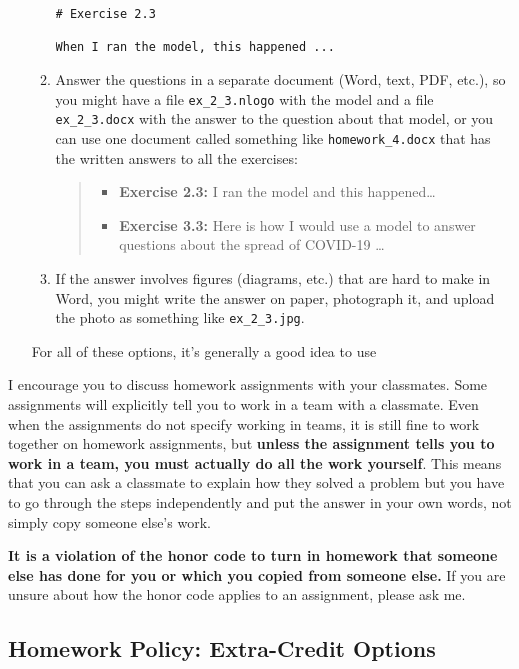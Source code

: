 \documentclass[
]{article}
\begin{document}
\begin{itemize}
\begin{enumerate}
\begin{verbatim}
# Exercise 2.3

When I ran the model, this happened ...
\end{verbatim}
  \item
    Answer the questions in a separate document (Word, text, PDF, etc.),
    so you might have a file \texttt{ex\_2\_3.nlogo} with the model and
    a file \texttt{ex\_2\_3.docx} with the answer to the question about
    that model, or you can use one document called something like
    \texttt{homework\_4.docx} that has the written answers to all the
    exercises:

    \begin{quote}
    \begin{itemize}
    \item
      \textbf{Exercise 2.3:} I ran the model and this happened\ldots{}
    \item
      \textbf{Exercise 3.3:} Here is how I would use a model to answer
      questions about the spread of COVID-19 \ldots{}
    \end{itemize}
    \end{quote}
  \item
    If the answer involves figures (diagrams, etc.) that are hard to
    make in Word, you might write the answer on paper, photograph it,
    and upload the photo as something like \texttt{ex\_2\_3.jpg}.
  \end{enumerate}

  For all of these options, it's generally a good idea to use
\end{itemize}

I encourage you to discuss homework assignments with your classmates.
Some assignments will explicitly tell you to work in a team with a
classmate. Even when the assignments do not specify working in teams, it
is still fine to work together on homework assignments, but
\textbf{unless the assignment tells you to work in a team, you must
actually do all the work yourself}. This means that you can ask a
classmate to explain how they solved a problem but you have to go
through the steps independently and put the answer in your own words,
not simply copy someone else's work.

\textbf{It is a violation of the honor code to turn in homework that
someone else has done for you or which you copied from someone else.} If
you are unsure about how the honor code applies to an assignment, please
ask me.

\hypertarget{homework-policy-extra-credit-options}{%
\subsection{Homework Policy: Extra-Credit
Options}\label{homework-policy-extra-credit-options}}
\end{document}
